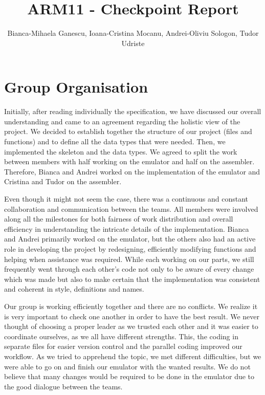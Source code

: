 \documentclass[11pt]{article}
\begin{document}
\title{ARM11 - Checkpoint Report}
\author{Bianca-Mihaela Ganescu, Ioana-Cristina Mocanu, Andrei-Oliviu Sologon, Tudor Udriste}

\maketitle

\section{Group Organisation}

Initially, after reading individually the specification, we have discussed our overall understanding and came to an agreement regarding the holistic view of the project. We decided to establish together the structure of our project (files and functions) and to define all the data types that were needed. Then, we implemented the skeleton and the data types. We agreed to split the work between members with half working on the emulator and half on the assembler. Therefore, Bianca and Andrei worked on the implementation of the emulator and Cristina and Tudor on the assembler.  

Even though it might not seem the case, there was a continuous and constant collaboration and communication between the teams. All members were involved along all the milestones for both fairness of work distribution and overall efficiency in understanding the intricate details of the implementation. Bianca and Andrei primarily worked on the emulator, but the others also had an active role in developing the project by redesigning, efficiently modifying functions and helping when assistance was required.  While each working on our parts, we still frequently went through each other's code not only to be aware of every change which was made but also to make certain that the implementation was consistent and coherent in style, definitions and names. 

Our group is working efficiently together and there are no conflicts. We realize it is very important to check one another in order to have the best result. We never thought of choosing a proper leader as we trusted each other and it was easier to coordinate ourselves, as we all have different strengths.  This, the coding in separate files for easier version control and the parallel coding improved our workflow. As we tried to apprehend the topic, we met different difficulties, but we were able to go on and finish our emulator with the wanted results. We do not believe that many changes would be required to be done in the emulator due to the good dialogue between the teams.
\end{document}
